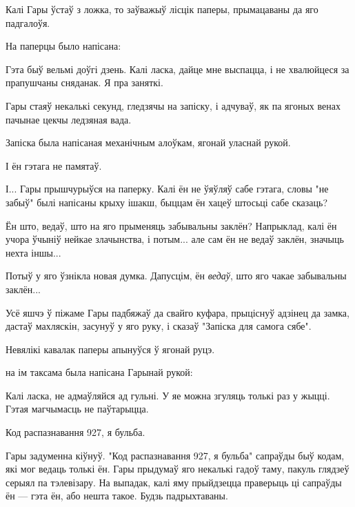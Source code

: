 Калі Гары ўстаў з ложка, то заўважыў лісцік паперы, прымацаваны да яго 
падгалоўя.

На паперцы было напісана:

\begin{writtenNote}

Гэта быў вельмі доўгі дзень. Калі ласка, дайце мне выспацца, і не хвалюйцеся 
за прапушчаны сняданак. Я  пра заняткі.

\end{writtenNote}

Гары стаяў некалькі секунд, гледзячы на запіску, і адчуваў, як па ягоных 
венах пачынае цекчы ледзяная вада.

Запіска была напісаная механічным алоўкам, ягонай уласнай рукой.

І ён гэтага не памятаў.

І... Гары прышчурыўся на паперку. Калі ён не ўяўляў сабе гэтага, словы
"не забыў" былі напісаны крыху ішакш, быццам ён хацеў штосьці сабе сказаць?

Ён што, ведаў, што на яго прыменяць забывальны заклён? Напрыклад, калі ён 
учора ўчыніў нейкае злачынства, і потым... але сам ён не ведаў заклён, значыць
нехта іншы...

Потыў у яго ўзнікла новая думка. Дапусцім, ён \emph{ведаў}, што яго чакае 
забывальны заклён...

Усё яшчэ ў піжаме Гары падбяжаў да свайго куфара, прыціснуў адзінец да замка,
дастаў махляскін, засунуў у яго руку, і сказаў "Запіска для самога сябе".

Невялікі кавалак паперы апынуўся ў ягонай руцэ.

на ім таксама была напісана Гарынай рукой:

\begin{writtenNote}
Калі ласка, не адмаўляйся ад гульні. У яе можна згуляць толькі раз 
у жыцці. Гэтая магчымасць не паўтарыцца.

Код распазнавання 927, я бульба.

\end{writtenNote}

Гары задуменна кіўнуў. "Код распазнавання 927, я бульба" сапраўды быў 
кодам, які мог ведаць толькі ён. Гары прыдумаў яго некалькі гадоў таму,
пакуль глядзеў серыял па тэлевізару. На выпадак, калі яму прыйдзецца праверыць
ці сапраўды ён --- гэта ён, або нешта такое. Будзь падрыхтаваны.

